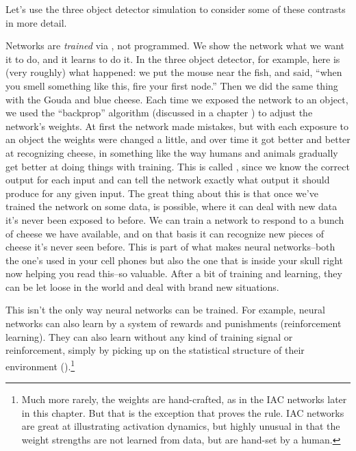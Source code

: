 Let's use the three object detector simulation to consider some of these contrasts in more detail. 

Networks are \emph{trained} via , not programmed. We show the network what we want it to do, and it learns to do it. In the three object detector, for example, here is (very roughly) what happened: we put the mouse near the fish, and said, ``when you smell something like this, fire your first node.''  Then we did the same thing with the Gouda and blue cheese. Each time we exposed the network to an object, we used the ``backprop'' algorithm (discussed in a chapter ) to adjust the network's weights. At first the network made mistakes, but with each exposure to an object the weights were changed a little, and over time it got better and better at recognizing cheese, in something like the way humans and animals gradually get better at doing things with training. This is called , since we know the correct output for each input and can tell the network exactly what output it should produce for any given input.  The great thing about this is that once we've trained the network on some data,  is possible, where it can deal with new data it's never been exposed to before. We can train a network to respond to a bunch of cheese we have available, and on that basis it can recognize new pieces of cheese it's never seen before. This is part of what makes neural networks--both the one's used in your cell phones but also the one that is inside your skull right now helping you read this--so valuable. After a bit of training and learning, they can be let loose in the world and deal with brand new situations.

This isn't the only way neural networks can be trained. For example, neural networks can also learn by a system of rewards and punishments (reinforcement learning). They can also learn without any kind of training signal or reinforcement, simply by picking up on the statistical structure of their environment ().\footnote{Much more rarely, the weights are hand-crafted, as in the IAC networks later in this chapter. But that is the exception that proves the rule. IAC networks are great at illustrating activation dynamics, but highly unusual in that the weight strengths are not learned from data, but are hand-set by a human.}

